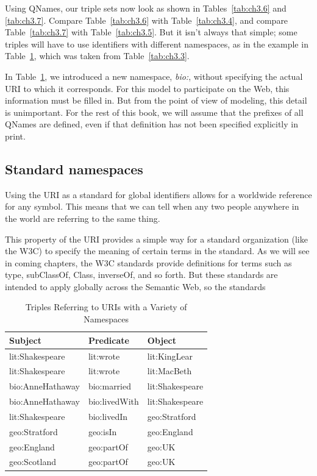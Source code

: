 Using QNames, our triple sets now look as shown in Tables~\ref{tab:ch3.6} and \ref{tab:ch3.7}.
Compare Table~\ref{tab:ch3.6} with Table~\ref{tab:ch3.4}, and compare Table~\ref{tab:ch3.7} with Table~\ref{tab:ch3.5}.
But it isn't always that simple; some triples will have to use
identifiers with different namespaces, as in the example in Table~\ref{tab:ch3.8},
which was taken from Table~\ref{tab:ch3.3}.

In Table~\ref{tab:ch3.8}, we introduced a new namespace, \emph{bio:}, without
specifying the actual URI to which it corresponds. For this model to
participate on the Web, this information must be filled in. But from the
point of view of modeling, this detail is unimportant. For the rest of
this book, we will assume that the prefixes of all QNames are defined,
even if that definition has not been specified explicitly in print.

\subsection{Standard namespaces}

Using the URI as a standard for global identifiers allows for a
worldwide reference for any symbol. This means that we can tell when any
two people anywhere in the world are referring to the same thing.

This property of the URI provides a simple way for a standard
organization (like the W3C) to specify the meaning of certain terms in
the standard. As we will see in coming chapters, the W3C standards
provide definitions for terms such as type, subClassOf, Class,
inverseOf, and so forth. But these standards are intended to apply
globally across the Semantic Web, so the standards

\begin{table}[h]
\centering
\begin{tabular}{||l l l ||} 
 \hline
 Subject&Predicate&Object \\ [0.5ex] 
 \hline\hline
lit:Shakespeare&lit:wrote&lit:KingLear\\
lit:Shakespeare&lit:wrote&lit:MacBeth\\
bio:AnneHathaway&bio:married&lit:Shakespeare\\
bio:AnneHathaway&bio:livedWith&lit:Shakespeare\\
lit:Shakespeare&bio:livedIn&geo:Stratford\\
geo:Stratford&geo:isIn&geo:England\\
geo:England&geo:partOf&geo:UK\\
geo:Scotland&geo:partOf&geo:UK\\
\hline
\end{tabular}
\caption{Triples Referring to URIs with a Variety of Namespaces}
\label{tab:ch3.8}
\end{table}

